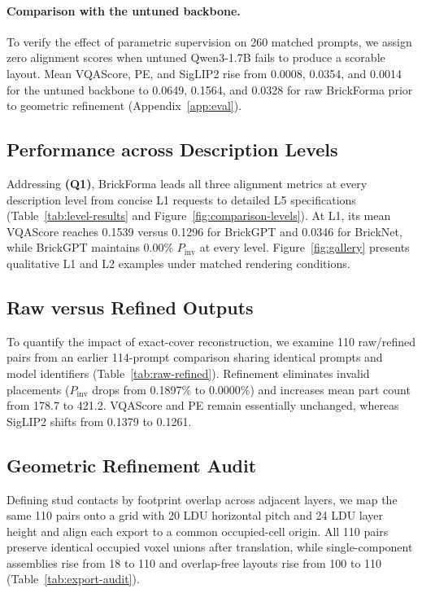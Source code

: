 \documentclass[letterpaper]{article} %
\begin{document}
\paragraph{Comparison with the untuned backbone.}
To verify the effect of parametric supervision on 260 matched prompts, we assign zero alignment scores when untuned Qwen3-1.7B fails to produce a scorable layout. Mean VQAScore, PE, and SigLIP2 rise from 0.0008, 0.0354, and 0.0014 for the untuned backbone to 0.0649, 0.1564, and 0.0328 for raw BrickForma prior to geometric refinement (Appendix~\ref{app:eval}).

\subsection{Performance across Description Levels}

Addressing \textbf{(Q1)}, BrickForma leads all three alignment metrics at every description level from concise L1 requests to detailed L5 specifications (Table~\ref{tab:level-results} and Figure~\ref{fig:comparison-levels}). At L1, its mean VQAScore reaches 0.1539 versus 0.1296 for BrickGPT and 0.0346 for BrickNet, while BrickGPT maintains 0.00\% $P_{\mathrm{inv}}$ at every level. Figure~\ref{fig:gallery} presents qualitative L1 and L2 examples under matched rendering conditions.



\subsection{Raw versus Refined Outputs}

To quantify the impact of exact-cover reconstruction, we examine 110 raw/refined pairs from an earlier 114-prompt comparison sharing identical prompts and model identifiers (Table~\ref{tab:raw-refined}). Refinement eliminates invalid placements ($P_{\mathrm{inv}}$ drops from 0.1897\% to 0.0000\%) and increases mean part count from 178.7 to 421.2. VQAScore and PE remain essentially unchanged, whereas SigLIP2 shifts from 0.1379 to 0.1261.

\subsection{Geometric Refinement Audit}
\label{sec:diagnostics}
Defining stud contacts by footprint overlap across adjacent layers, we map the same 110 pairs onto a grid with 20 LDU horizontal pitch and 24 LDU layer height and align each export to a common occupied-cell origin. All 110 pairs preserve identical occupied voxel unions after translation, while single-component assemblies rise from 18 to 110 and overlap-free layouts rise from 100 to 110 (Table~\ref{tab:export-audit}).

\end{document}
